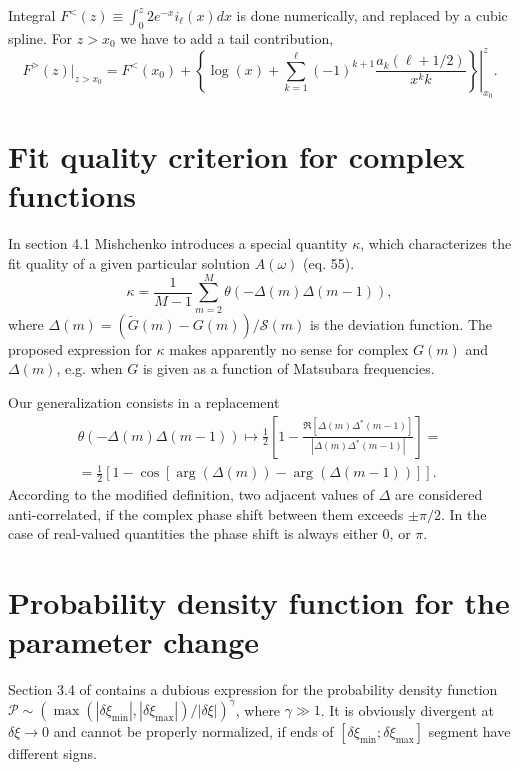 \documentclass[]{article}
\begin{document}
Integral $F^<(z) \equiv \int_0^z 2 e^{-x} i_\ell(x) dx$ is done numerically,
and replaced by a cubic spline. For $z>x_0$ we have to add a tail contribution,
\begin{equation}
F^>(z)|_{z>x_0} = F^<(x_0) + \left.\left\{
\log(x) + \sum_{k=1}^\ell (-1)^{k+1}\frac{a_k(\ell+1/2)}{x^k k}
\right\}\right|_{x_0}^z.
\end{equation}

\section{Fit quality criterion for complex functions}
\label{fit_quality}

In section 4.1 Mishchenko introduces a special quantity $\kappa$, which characterizes the fit quality of a given particular solution
$A(\omega)$ (eq. 55).
\begin{equation}
	\kappa = \frac{1}{M-1}\sum_{m=2}^M\theta(-\Delta(m)\Delta(m-1)),
\end{equation}
where $\Delta(m) = (\tilde G(m) - G(m))/\mathcal{S}(m)$ is the deviation function. The proposed expression for $\kappa$ makes  apparently no sense for complex $G(m)$ and $\Delta(m)$, e.g. when $G$ is given as a function of Matsubara frequencies.

Our generalization consists in a replacement
\begin{multline}
	\theta(-\Delta(m)\Delta(m-1)) \mapsto
	\frac{1}{2}\left[1 - \frac{\Re[\Delta(m)\Delta^*(m-1)]}{|\Delta(m)\Delta^*(m-1)|} \right]=\\=
	\frac{1}{2}\left[ 1 - \cos[\arg(\Delta(m)) - \arg(\Delta(m-1))] \right].
\end{multline}
According to the modified definition, two adjacent values of $\Delta$ are considered anti-correlated, if the complex phase shift between them exceeds $\pm\pi/2$. In the case of real-valued quantities the phase shift is always either 0, or $\pi$.

\section{Probability density function for the parameter change}
\label{prob_function}

Section 3.4 of \cite{som_lecture} contains a dubious expression for the probability
density function $\mathcal{P}\sim (\max(|\delta\xi_\mathrm{min}|, |\delta\xi_\mathrm{max}|)/|\delta\xi|)^\gamma$, where $\gamma\gg1$. It is
obviously divergent at $\delta\xi\to0$ and cannot be properly normalized, if
ends of $[\delta\xi_\mathrm{min};\delta\xi_\mathrm{max}]$ segment have different signs.
\end{document}

